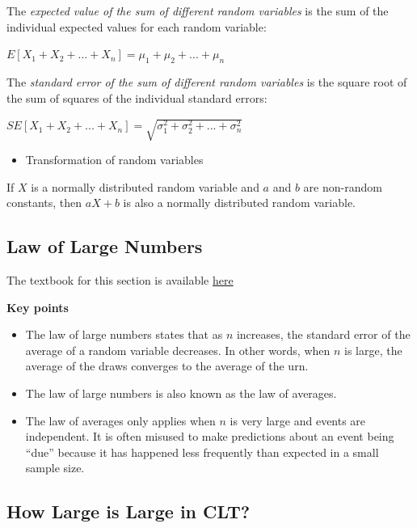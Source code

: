 \documentclass[
]{article}
\providecommand{\tightlist}{%
  \setlength{\itemsep}{0pt}\setlength{\parskip}{0pt}}
\begin{document}
The \emph{expected value of the sum of different random variables} is
the sum of the individual expected values for each random variable:

\(E \left [X_1 + X_2 + ... + X_n \right ] = \mu_1 + \mu_2 + ... + \mu_n\)

The \emph{standard error of the sum of different random variables} is
the square root of the sum of squares of the individual standard errors:

\(SE \left [X_1 + X_2 + ... + X_n \right ] = \sqrt{\sigma_1^2 + \sigma_2^2 + ... + \sigma_n^2}\)

\begin{itemize}
\tightlist
\item
  Transformation of random variables
\end{itemize}

If \(X\) is a normally distributed random variable and \(a\) and \(b\)
are non-random constants, then \(aX + b\) is also a normally distributed
random variable.

\hypertarget{law-of-large-numbers}{%
\subsection{Law of Large Numbers}\label{law-of-large-numbers}}

The textbook for this section is available
\href{https://rafalab.github.io/dsbook/random-variables.html\#law-of-large-numbers}{here}

\textbf{Key points}

\begin{itemize}
\tightlist
\item
  The law of large numbers states that as \(n\) increases, the standard
  error of the average of a random variable decreases. In other words,
  when \(n\) is large, the average of the draws converges to the average
  of the urn.
\item
  The law of large numbers is also known as the law of averages.
\item
  The law of averages only applies when \(n\) is very large and events
  are independent. It is often misused to make predictions about an
  event being ``due'' because it has happened less frequently than
  expected in a small sample size.
\end{itemize}

\hypertarget{how-large-is-large-in-clt}{%
\subsection{How Large is Large in
CLT?}\label{how-large-is-large-in-clt}}
\end{document}
